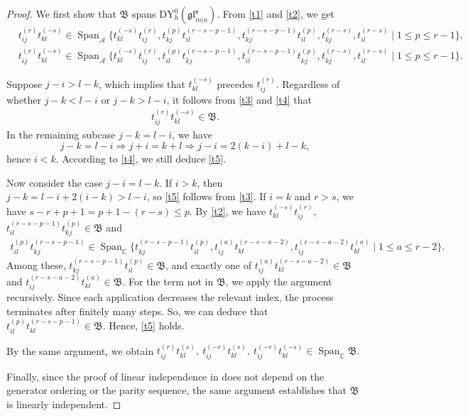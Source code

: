 \documentclass[a4paper,12pt]{article}
\numberwithin{equation}{section}
\begin{document}
\begin{proof}
We first show that $\mathfrak{B}$ spans $\mathrm{DY}_{h}^{0}(\mathfrak{gl}^{\mathfrak{s}}_{m|n})$. From \eqref{t1} and \eqref{t2}, we get
\begin{align}\label{t3}
&t_{ij}^{(r)}t_{kl}^{(-s)}\in\operatorname{Span}_{\mathcal{A}}\{t_{kl}^{(-s)}t_{ij}^{(r)}, t_{kj}^{(p)}t_{il}^{(r-s-p-1)}, t_{kj}^{(r-s-p-1)}t_{il}^{(p)}, t_{kj}^{(r-s)},t_{il}^{(r-s)}\mid 1\leq p\leq r-1\},\\ \label{t4}
&t_{ij}^{(r)}t_{kl}^{(-s)}\in\operatorname{Span}_{\mathcal{A}}\{t_{kl}^{(-s)}t_{ij}^{(r)}, t_{il}^{(p)}t_{kj}^{(r-s-p-1)}, t_{il}^{(r-s-p-1)}t_{kj}^{(p)}, t_{kj}^{(r-s)},t_{il}^{(r-s)}\mid 1\leq p\leq r-1\}.
\end{align}

Suppose $j-i>l-k$, which implies that $t_{kl}^{(-s)}$ precedes $t_{ij}^{(r)}$. Regardless of whether $j-k<l-i$ or $j-k>l-i$, it follows from \eqref{t3} and \eqref{t4} that
\begin{align}\label{t5}
t_{ij}^{(r)}t_{kl}^{(-s)}\in\mathfrak{B}.
\end{align}
In the remaining subcase $j-k=l-i$, we have
$$
j-k=l-i\Rightarrow j+i=k+l\Rightarrow j-i=2(k-i)+l-k,
$$
hence $i<k$. According to \eqref{t4}, we still deduce \eqref{t5}.

Now consider the case $j-i=l-k$. If $i>k$, then $j-k=l-i+2(i-k)>l-i$, so \eqref{t5} follows from \eqref{t3}. If $i=k$ and $r>s$, we have $s-r+p+1=p+1-(r-s)\leq p$. By \eqref{t2}, we have $t_{kl}^{(-s)}t_{ij}^{(r)}$, $t_{il}^{(r-s-p-1)}t_{kj}^{(p)}
\in\mathfrak{B}$ and
\begin{align*}
t_{il}^{(p)}t_{kj}^{(r-s-p-1)}\in\operatorname{Span}_{\mathbb{C}}\{t_{kj}^{(r-s-p-1)}t_{il}^{(p)}, t_{ij}^{(a)}t_{kl}^{(r-s-a-2)}, t_{ij}^{(r-s-a-2)}t_{kl}^{(a)}\mid 1\leq a\leq r-2\}.
\end{align*}
Among these, $t_{kj}^{(r-s-p-1)}t_{il}^{(p)}\in\mathfrak{B}$, and exactly one of $t_{ij}^{(a)}t_{kl}^{(r-s-a-2)}\in\mathfrak{B}$ and $t_{ij}^{(r-s-a-2)}t_{kl}^{(a)}\in\mathfrak{B}$. For the term not in $\mathfrak{B}$, we apply the argument recursively. Since each application decreases the relevant index, the process terminates after finitely many steps. So, we can deduce that $t_{il}^{(p)}t_{kl}^{(r-s-p-1)}\in\mathfrak{B}$. Hence, \eqref{t5} holds.

By the same argument, we obtain $t_{ij}^{(r)}t_{kl}^{(s)},~ t_{ij}^{(-r)}t_{kl}^{(s)}, ~t_{ij}^{(-r)}t_{kl}^{(-s)}\in\operatorname{Span}_{\mathbb{C}}\mathfrak{B}.
$

Finally, since the proof of linear independence in \cite[Theorem 2.6]{BK25-2} does not depend on the generator ordering or the parity sequence, the same argument establishes that $\mathfrak{B}$ is linearly independent.
\end{proof}
\end{document}

